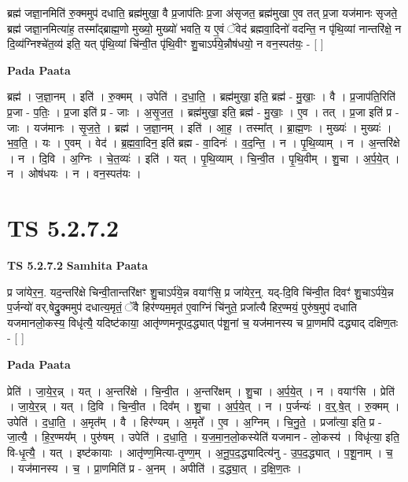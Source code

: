 \documentclass[17pt]{extarticle}
\begin{document}
ब्रह्म॑ जज्ञा॒नमिति॑ रु॒क्ममुप॑ दधाति॒ ब्रह्म॑मुखा॒ वै प्र॒जाप॑तिः प्र॒जा अ॑सृजत॒ ब्रह्म॑मुखा ए॒व तत् प्र॒जा यज॑मानः सृजते॒ ब्रह्म॑ जज्ञा॒नमित्या॑ह॒ तस्मा᳚द्ब्राह्म॒णो मुख्यो॒ मुख्यो॑ भवति॒ य ए॒वं ॅवेद॑ ब्रह्मवा॒दिनो॑ वदन्ति॒ न पृ॑थि॒व्यां नान्तरि॑क्षे॒ न दि॒व्य॑ग्निश्चे॑त॒व्य॑ इति॒ यत् पृ॑थि॒व्यां चि॑न्वी॒त पृ॑थि॒वीꣳ शु॒चाऽर्प॑ये॒न्नौष॑धयो॒ न वन॒स्पत॑यः॒ - [  ] \newline

\textbf{Pada Paata} \newline

ब्रह्म॑ । ज॒ज्ञा॒नम् । इति॑ । रु॒क्मम् । उपेति॑ । द॒धा॒ति॒ । ब्रह्म॑मुखा॒ इति॒ ब्रह्म॑ - मु॒खाः॒ । वै । प्र॒जाप॑ति॒रिति॑ प्र॒जा - प॒तिः॒ । प्र॒जा इति॑ प्र - जाः । अ॒सृ॒ज॒त॒ । ब्रह्म॑मुखा॒ इति॒ ब्रह्म॑ - मु॒खाः॒ । ए॒व । तत् । प्र॒जा इति॑ प्र - जाः । यज॑मानः । सृ॒ज॒ते॒ । ब्रह्म॑ । ज॒ज्ञा॒नम् । इति॑ । आ॒ह॒ । तस्मा᳚त् । ब्रा॒ह्म॒णः । मुख्यः॑ । मुख्यः॑ । भ॒व॒ति॒ । यः । ए॒वम् । वेद॑ । ब्र॒ह्म॒वा॒दिन॒ इति॑ ब्रह्म - वा॒दिनः॑ । व॒द॒न्ति॒ । न । पृ॒थि॒व्याम् । न । अ॒न्तरि॑क्षे । न । दि॒वि । अ॒ग्निः । चे॒त॒व्यः॑ । इति॑ । यत् । पृ॒थि॒व्याम् । चि॒न्वी॒त । पृ॒थि॒वीम् । शु॒चा । अ॒र्प॒ये॒त् । न । ओष॑धयः । न । वन॒स्पत॑यः ।  \newline





\section{ TS 5.2.7.2 }

\textbf{TS 5.2.7.2 } \newline
\textbf{Samhita Paata} \newline

प्र जा॑येर॒न॒. यद॒न्तरि॑क्षे चिन्वी॒तान्तरि॑क्षꣳ शु॒चाऽर्प॑ये॒न्न वयाꣳ॑सि॒ प्र जा॑येर॒न्॒. यद्-दि॒वि चि॑न्वी॒त दिवꣳ॑ शु॒चाऽर्प॑ये॒न्न प॒र्जन्यो॑ वर्.षेद्रु॒क्ममुप॑ दधात्य॒मृतं॒ ॅवै हिर॑ण्यम॒मृत॑ ए॒वाग्निं चि॑नुते॒ प्रजा᳚त्यै हिर॒ण्मयं॒ पुरु॑ष॒मुप॑ दधाति यजमानलो॒कस्य॒ विधृ॑त्यै॒ यदिष्ट॑काया॒ आतृ॑ण्णमनूपद॒द्ध्यात् प॑शू॒नां च॒ यज॑मानस्य च प्रा॒णमपि॑ दद्ध्याद् दक्षिण॒तः - [  ] \newline

\textbf{Pada Paata} \newline

प्रेति॑ । जा॒ये॒र॒न्न् । यत् । अ॒न्तरि॑क्षे । चि॒न्वी॒त । अ॒न्तरि॑क्षम् । शु॒चा । अ॒र्प॒ये॒त् । न । वयाꣳ॑सि । प्रेति॑ । जा॒ये॒र॒न्न् । यत् । दि॒वि । चि॒न्वी॒त । दिव᳚म् । शु॒चा । अ॒र्प॒ये॒त् । न । प॒र्जन्यः॑ । व॒र्॒.षे॒त् । रु॒क्मम् । उपेति॑ । द॒धा॒ति॒ । अ॒मृत᳚म् । वै । हिर॑ण्यम् । अ॒मृते᳚ । ए॒व । अ॒ग्निम् । चि॒नु॒ते॒ । प्रजा᳚त्या॒ इति॒ प्र - जा॒त्यै॒ । हि॒र॒ण्मय᳚म् । पुरु॑षम् । उपेति॑ । द॒धा॒ति॒ । य॒ज॒मा॒न॒लो॒कस्येति॑ यजमान - लो॒कस्य॑ । विधृ॑त्या॒ इति॒ वि-धृ॒त्यै॒ । यत् । इष्ट॑कायाः । आतृ॑ण्ण॒मित्या-तृ॒ण्ण॒म् । अ॒नू॒प॒द॒द्ध्यादित्य॑नु - उ॒प॒द॒द्ध्यात् । प॒शू॒नाम् । च॒ । यज॑मानस्य । च॒ । प्रा॒णमिति॑ प्र - अ॒नम् । अपीति॑ । द॒द्ध्या॒त् । द॒क्षि॒ण॒तः ।  \newline
\end{document}
